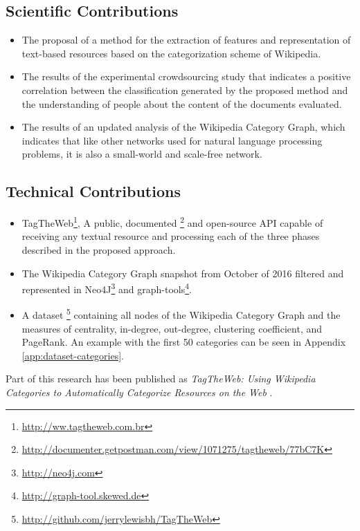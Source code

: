 \subsection{\hspace*{3pt}Scientific Contributions}


\begin{itemize}
\item The proposal of a method for the extraction of features and representation of text-based resources based on the categorization scheme of Wikipedia.

\item The results of the experimental crowdsourcing study that indicates a positive correlation between the classification generated by the proposed method and the understanding of people about the content of the documents evaluated.

\item The results of an updated analysis of the Wikipedia Category Graph, which indicates that like other networks used for natural language processing problems, it is also a small-world and scale-free network.


\end{itemize}


\subsection{\hspace*{3pt}Technical Contributions}

\begin{itemize}
\item TagTheWeb\footnote{\url{http://ww.tagtheweb.com.br}}, A public, documented \footnote{\url{http://documenter.getpostman.com/view/1071275/tagtheweb/77bC7K}} and open-source API capable of receiving any textual resource and processing each of the three phases described in the proposed approach.

\item  The Wikipedia Category Graph snapshot from October of 2016 filtered and represented in Neo4J\footnote{\url{http://neo4j.com}} and graph-tools\footnote{\url{http://graph-tool.skewed.de}}.  

\item A dataset \footnote {\url{http://github.com/jerrylewisbh/TagTheWeb}} containing all nodes of the Wikipedia Category Graph and the measures of centrality, in-degree, out-degree, clustering coefficient, and PageRank. An example with the first 50 categories can be seen in Appendix \ref{app:dataset-categories}.

\end{itemize}
Part of this research has been published as \textit{TagTheWeb: Using Wikipedia Categories to Automatically Categorize Resources on the Web} \cite{medeiros2018tagtheweb}.

